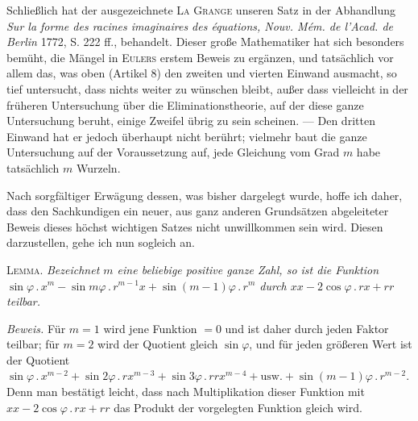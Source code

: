 Schließlich hat der ausgezeichnete \textsc{La Grange} unseren Satz in der Abhandlung \textit{Sur la forme des racines imaginaires des équations, Nouv. Mém. de l'Acad. de Berlin} 1772, S. 222 ff., behandelt. Dieser große Mathematiker hat sich besonders bemüht, die Mängel in \textsc{Eulers} erstem Beweis zu ergänzen, und tatsächlich vor allem das, was oben (Artikel 8) den zweiten und vierten Einwand ausmacht, so tief untersucht, dass nichts weiter zu wünschen bleibt, außer dass vielleicht in der früheren Untersuchung über die Eliminationstheorie, auf der diese ganze Untersuchung beruht, einige Zweifel übrig zu sein scheinen. --- Den dritten Einwand hat er jedoch überhaupt nicht berührt; vielmehr baut die ganze Untersuchung auf der Voraussetzung auf, jede Gleichung vom Grad $m$ habe tatsächlich $m$ Wurzeln.

Nach sorgfältiger Erwägung dessen, was bisher dargelegt wurde, hoffe ich daher, dass den Sachkundigen ein neuer, aus ganz anderen Grundsätzen abgeleiteter Beweis dieses höchst wichtigen Satzes nicht unwillkommen sein wird. Diesen darzustellen, gehe ich nun sogleich an.

\textsc{Lemma.} \textit{Bezeichnet $m$ eine beliebige positive ganze Zahl, so ist die Funktion $\sin\varphi\mathbin{.}x^m-\sin m\varphi\mathbin{.}r^{m-1}x+\sin(m-1)\varphi\mathbin{.}r^m$ durch $xx-2\cos\varphi\mathbin{.}rx+rr$ teilbar.}

\textit{Beweis.} Für $m=1$ wird jene Funktion $=0$ und ist daher durch jeden Faktor teilbar; für $m=2$ wird der Quotient gleich $\sin\varphi$, und für jeden größeren Wert ist der Quotient $\sin\varphi\mathbin{.}x^{m-2}+\sin2\varphi\mathbin{.}rx^{m-3}+\sin3\varphi\mathbin{.}rrx^{m-4}+\text{usw.}+\sin(m-1)\varphi\mathbin{.}r^{m-2}$. Denn man bestätigt leicht, dass nach Multiplikation dieser Funktion mit $xx-2\cos\varphi\mathbin{.}rx+rr$ das Produkt der vorgelegten Funktion gleich wird.
